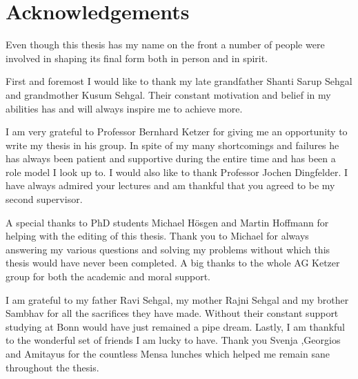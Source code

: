 \chapter*{Acknowledgements}
\label{sec:ack}
Even though this thesis has my name on the front a number of people were involved in shaping its final form both in person and in spirit.

First and foremost I would like to thank my late grandfather Shanti Sarup Sehgal and grandmother Kusum Sehgal. Their constant motivation and belief in my abilities has and will always inspire me to achieve more.

I am very grateful to Professor Bernhard Ketzer for giving me an opportunity to write my thesis in his group. In spite of my many shortcomings and failures he has always been patient and supportive during the entire time and has been a role model I look up to. I would also like to thank Professor Jochen Dingfelder. I have always admired your lectures and am thankful that you agreed to be my second supervisor.

A special thanks to PhD students Michael Hösgen and Martin Hoffmann for helping with the editing of this thesis. Thank you to Michael for always answering my various questions and solving my problems without which this thesis would have never been completed. A big thanks to the whole AG Ketzer group for both the academic and moral support.

I am grateful to my father Ravi Sehgal, my mother Rajni Sehgal and my brother Sambhav for all the sacrifices they have made. Without their constant support studying at Bonn would have just remained a pipe dream. Lastly, I am thankful to the wonderful set of friends I am lucky to have. Thank you Svenja ,Georgios and Amitayus for the countless Mensa lunches which helped me remain sane throughout the thesis.

